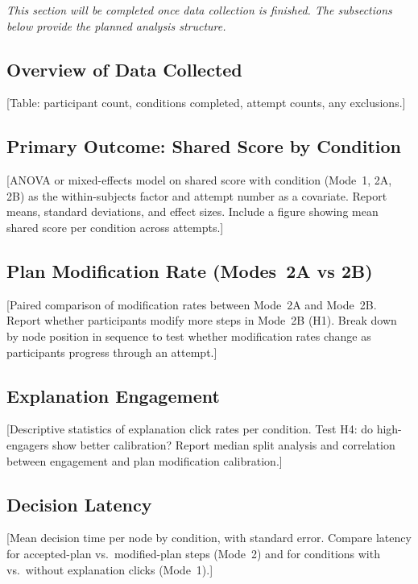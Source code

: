 \documentclass[11pt]{article}
\theoremstyle{definition}
\begin{document}
\textit{This section will be completed once data collection is finished.  The subsections
below provide the planned analysis structure.}

\subsection{Overview of Data Collected}

[Table: participant count, conditions completed, attempt counts, any exclusions.]

\subsection{Primary Outcome: Shared Score by Condition}

[ANOVA or mixed-effects model on shared score with condition (Mode~1, 2A, 2B) as the
within-subjects factor and attempt number as a covariate.  Report means, standard
deviations, and effect sizes.  Include a figure showing mean shared score per condition
across attempts.]

\subsection{Plan Modification Rate (Modes~2A vs 2B)}

[Paired comparison of modification rates between Mode~2A and Mode~2B.  Report whether
participants modify more steps in Mode~2B (H1).  Break down by node position in sequence
to test whether modification rates change as participants progress through an attempt.]

\subsection{Explanation Engagement}

[Descriptive statistics of explanation click rates per condition.  Test H4: do
high-engagers show better calibration?  Report median split analysis and correlation
between engagement and plan modification calibration.]

\subsection{Decision Latency}

[Mean decision time per node by condition, with standard error.  Compare latency for
accepted-plan vs.\ modified-plan steps (Mode~2) and for conditions with vs.\ without
explanation clicks (Mode~1).]
\end{document}
